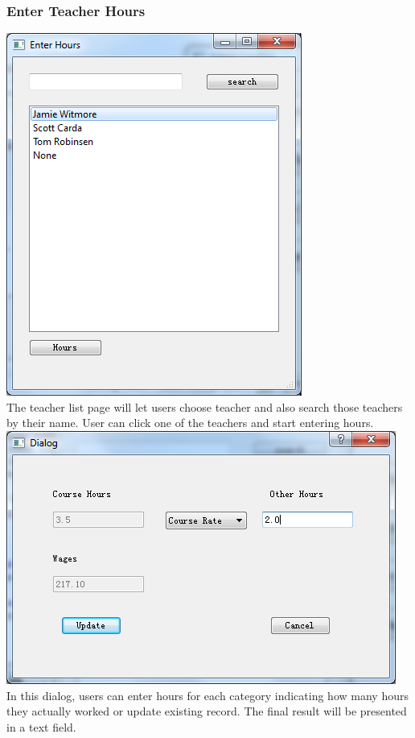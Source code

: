 \subsubsection{Enter Teacher Hours}
\includegraphics[scale=0.5]{pics/enter_hours_main.png}\\
The teacher list page will let users choose teacher and also search those teachers by their name. User can click one of the teachers and start entering hours.\\
\includegraphics[scale=0.5]{pics/enter_hours_dialog.png}\\
In this dialog, users can enter hours for each category indicating how many hours they actually worked or update existing record. The final result will be presented in a text field.
 
